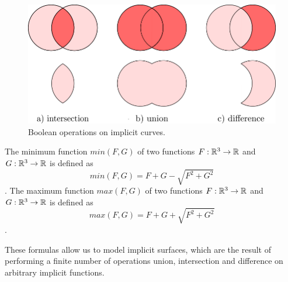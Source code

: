 \begin{figure}
    \centerline{\includegraphics[scale=0.5]{images/img19}}
    \caption[Boolean operations on implicit curves]
    {Boolean operations on implicit curves.}
    \label{img:19}
\end{figure}

\begin{theorem}
    The minimum function $min(F, G)$ of two functions $F:\mathbb{R}^3 \to \mathbb{R}$ and
    $G:\mathbb{R}^3 \to \mathbb{R}$ is defined as $$min(F, G) = F + G - \sqrt{F^2+G^2}$$.
    The maximum function $max(F, G)$ of two functions $F:\mathbb{R}^3 \to \mathbb{R}$ and
    $G:\mathbb{R}^3 \to \mathbb{R}$ is defined as $$max(F, G) = F + G + \sqrt{F^2+G^2}$$.
\end{theorem}

These formulas allow us to model implicit surfaces, which are the result of
performing a finite number of operations union, intersection and difference
on arbitrary implicit functions.


